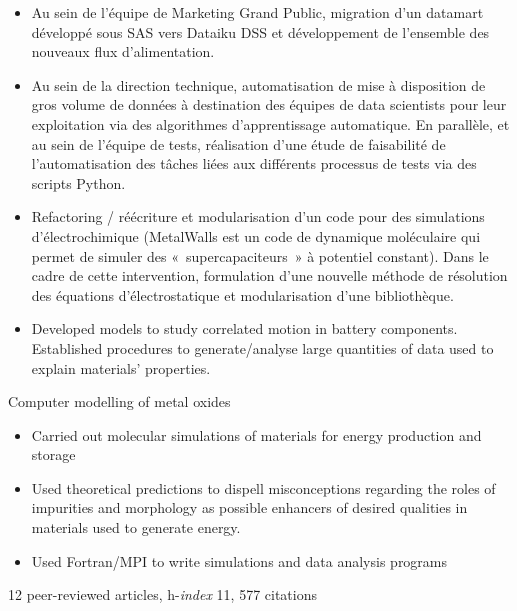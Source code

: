 \documentclass[10pt,a4paper,ragged2e,academicons]{altacv}
\begin{document}
\divider

\begin{itemize}
\item Au sein de l’équipe de Marketing Grand Public, migration d’un datamart développé sous
SAS vers Dataiku DSS et développement de l’ensemble des nouveaux flux d’alimentation. 
\end{itemize}

\divider

\begin{itemize}
\item Au sein de la direction technique, automatisation de mise à disposition de gros volume de
données à destination des équipes de data scientists pour leur exploitation via des
algorithmes d’apprentissage automatique.
En parallèle, et au sein de l’équipe de tests, réalisation d’une étude de faisabilité de
l’automatisation des tâches liées aux différents processus de tests via des scripts Python. 
\end{itemize}

\divider

\begin{itemize}
\item Refactoring / réécriture et modularisation d’un code pour des simulations
d’électrochimique (MetalWalls est un code de dynamique moléculaire qui permet de
simuler des « supercapaciteurs » à potentiel constant).
Dans le cadre de cette intervention, formulation d’une nouvelle méthode de résolution
des équations d’électrostatique et modularisation d'une bibliothèque. 
\end{itemize}

\divider

\begin{itemize}
\item Developed models to study correlated motion in
battery components.
Established procedures to generate/analyse large
quantities of data used to explain materials'
properties. 
\end{itemize}

\divider

Computer modelling of metal oxides
\smallskip
\begin{itemize}
\item Carried out molecular simulations of materials for energy production and storage
\item Used theoretical predictions to dispell
misconceptions regarding the roles of impurities
and morphology as possible enhancers of
desired qualities in materials used to generate
energy.
\item Used Fortran/MPI to write simulations and data analysis programs
\end{itemize}
{\small 12 peer-reviewed articles, h-\textit{index} 11, 577 citations}
\end{document}
